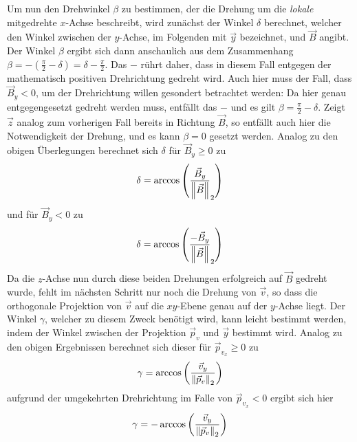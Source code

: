 Um nun den Drehwinkel \(\beta\) zu bestimmen, der die Drehung um die \textit{lokale} mitgedrehte \(x\)-Achse beschreibt, wird
zun\"achst der Winkel \(\delta\) berechnet, welcher den Winkel zwischen der \(y\)-Achse, im Folgenden mit \(\vec{y}\) bezeichnet,
und \(\vec{B}\) angibt. Der Winkel \(\beta\) ergibt sich dann anschaulich aus dem Zusammenhang
\(\beta = -\left(\frac{\pi}{2} - \delta\right) = \delta - \frac{\pi}{2}\). Das \(-\) r\"uhrt daher, dass in diesem Fall entgegen
der mathematisch positiven Drehrichtung gedreht wird. Auch hier muss der Fall, dass \(\vec{B}_y < 0 \), um der Drehrichtung willen
gesondert betrachtet werden: Da hier genau entgegengesetzt gedreht werden muss, entf\"allt das \(-\) und es gilt
\(\beta = \frac{\pi}{2} - \delta\). Zeigt \(\vec{z}\) analog zum vorherigen Fall bereits in Richtung \(\vec{B}\), so entf\"allt auch
hier die Notwendigkeit der Drehung, und es kann \(\beta = 0\) gesetzt werden. Analog zu den obigen \"Uberlegungen berechnet sich
\(\delta\) f\"ur \(\vec{B}_y \geq 0\) zu
\begin{equation}
  \delta = \arccos{\left(\frac{\vec{B}_y}{\left\lVert\vec{B}\right\rVert}_2\right)}
\end{equation}
und f\"ur \(\vec{B}_y < 0 \) zu
\begin{equation}
  \delta = \arccos{\left(\frac{-\vec{B}_y}{\left\lVert\vec{B}\right\rVert}_2\right)}
\end{equation}
Da die \(z\)-Achse nun durch diese beiden Drehungen erfolgreich auf \(\vec{B}\) gedreht wurde, fehlt im n\"achsten Schritt nur noch
die Drehung von \(\vec{v}\), so dass die orthogonale Projektion von \(\vec{v}\) auf die \(xy\)-Ebene genau auf der \(y\)-Achse
liegt. Der Winkel \(\gamma\), welcher zu diesem Zweck ben\"otigt wird, kann leicht bestimmt werden, indem der Winkel zwischen
der Projektion \(\vec{p}_v\) und \(\vec{y}\) bestimmt wird. Analog zu den obigen Ergebnissen berechnet sich dieser f\"ur
\(\vec{p}_{v_x} \geq 0\) zu
\begin{equation}
  \gamma = \arccos{\left(\frac{\vec{v}_y}{\left\lVert\vec{p}_v\right\rVert_2}\right)}
\end{equation}
aufgrund der umgekehrten Drehrichtung im Falle von \(\vec{p}_{v_x} < 0\) ergibt sich hier
\begin{equation}
  \gamma = -\arccos{\left(\frac{\vec{v}_y}{\left\lVert\vec{p}_v\right\rVert_2}\right)}
\end{equation}

